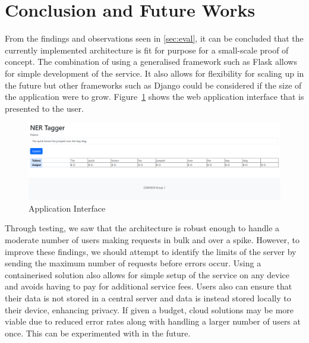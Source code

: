 \documentclass{surreydissertation}
\begin{document}
\section{Conclusion and Future Works}
From the findings and observations seen
in \autoref{sec:eval}, it can be concluded that the currently implemented architecture is fit for purpose for a small-scale proof of concept. The combination of using a generalised framework such as Flask allows for simple development of the service. It also allows for flexibility for scaling up in the future but other frameworks such as Django could be considered if the size of the application were to grow. Figure~\ref{fig:interface} shows the web application interface that is presented to the user.

\begin{figure}[H]
    \centering
    \includegraphics[width=1.0\linewidth]{Figures/frontend.png}
    \caption{Application Interface}
    \label{fig:interface}
 \end{figure}

Through testing, we saw that the architecture is robust enough to handle a moderate number of users making requests in bulk and over a spike. However, to improve these findings, we should attempt to identify the limits of the server by sending the maximum number of requests before errors occur. Using a containerised solution also allows for simple setup of the service on any device and avoids having to pay for additional service fees. Users also can ensure that their data is not stored in a central server and data is instead stored locally to their device, enhancing privacy. If given a budget, cloud solutions may be more viable due to reduced error rates along with handling a larger number of users at once. This can be experimented with in the future.

\appendix
%
%



\end{document}
